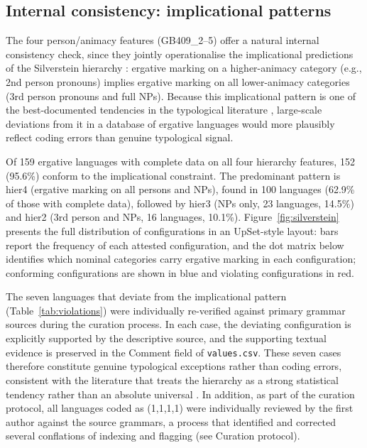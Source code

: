 \documentclass[12pt,a4paper]{article}
\begin{document}
\subsection{Internal consistency: implicational patterns}

The four person/animacy features (GB409\_2--5) offer a natural internal consistency check, since they jointly operationalise the implicational predictions of the Silverstein hierarchy \cite{silverstein1976}: ergative marking on a higher-animacy category (e.g., 2nd person pronouns) implies ergative marking on all lower-animacy categories (3rd person pronouns and full NPs). Because this implicational pattern is one of the best-documented tendencies in the typological literature \cite{comrie1989,bickel2008}, large-scale deviations from it in a database of ergative languages would more plausibly reflect coding errors than genuine typological signal.

Of 159 ergative languages with complete data on all four hierarchy features, 152 (95.6\%) conform to the implicational constraint. The predominant pattern is hier4 (ergative marking on all persons and NPs), found in 100 languages (62.9\% of those with complete data), followed by hier3 (NPs only, 23 languages, 14.5\%) and hier2 (3rd person and NPs, 16 languages, 10.1\%). Figure~\ref{fig:silverstein} presents the full distribution of configurations in an UpSet-style layout: bars report the frequency of each attested configuration, and the dot matrix below identifies which nominal categories carry ergative marking in each configuration; conforming configurations are shown in blue and violating configurations in red.

The seven languages that deviate from the implicational pattern (Table~\ref{tab:violations}) were individually re-verified against primary grammar sources during the curation process. In each case, the deviating configuration is explicitly supported by the descriptive source, and the supporting textual evidence is preserved in the Comment field of \texttt{values.csv}. These seven cases therefore constitute genuine typological exceptions rather than coding errors, consistent with the literature that treats the hierarchy as a strong statistical tendency rather than an absolute universal \cite{bickel2008}. In addition, as part of the curation protocol, all languages coded as (1,1,1,1) were individually reviewed by the first author against the source grammars, a process that identified and corrected several conflations of indexing and flagging (see Curation protocol).
\end{document}
